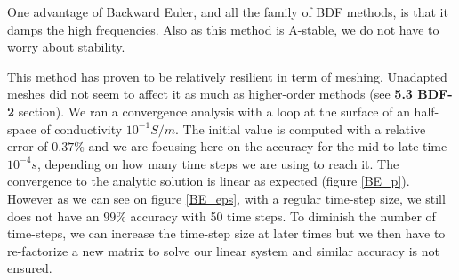 \documentclass[twoside]{article}
\begin{document}
One advantage of Backward Euler, and all the family of BDF methods, is that it damps the high frequencies. Also as this method is A-stable, we do not have to worry about stability.

This method has proven to be relatively resilient in term of meshing. Unadapted meshes did not seem to affect it as much as higher-order methods (see \textbf{5.3 BDF-2} section). We ran a convergence analysis with a loop at the surface of an half-space of conductivity $10^{-1} S/m$. The initial value is computed with a relative error of $0.37\%$ and we are focusing here on the accuracy for the mid-to-late time $10^{-4}s$, depending on how many time steps we are using to reach it. The convergence to the analytic solution is linear as expected (figure \ref{BE_p}). However as we can see on figure \ref{BE_eps}, with a regular time-step size, we still does not have an $99\%$ accuracy with 50 time steps. To diminish the number of time-steps, we can increase the time-step size at later times but we then have to re-factorize a new matrix to solve our linear system and similar accuracy is not ensured.

\end{document}
